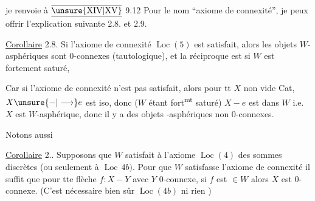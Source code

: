 
je renvoie à $\overline{\underline{\unsure{\mathrm{XIV}|\mathrm{XV}}}}$ 9.12  Pour le nom ``axiome de connexité'', je peux offrir l'explication suivante 2.8. et 2.9.

\uline{Corollaire} 2.8. Si  l'axiome de connexité $\operatorname{Loc}(5)$ est satisfait, alors les objets $W$-asphériques sont $0$-connexes (tautologique), et la réciproque est  si $W$ est fortement saturé, 


Car si l'axiome de connexité n'est pas satisfait, alors pour tt $X$ non vide  Cat, $X\unsure{{-}|\longrightarrow}e$ est iso, donc ($W$ étant fort\textsuperscript{mt} saturé) $X{-}e$ est dans $W$ i.e. $X$ est  $W$-asphérique, donc il y a des objets -asphériques non $0$-connexes.


Notons aussi

\uline{Corollaire} 2.. Supposons que $W$ satisfait à l'axiome $\operatorname{Loc}(4)$ des sommes discrètes (ou seulement à $\operatorname{Loc}\,4b)$. Pour que $W$ satisfasse l'axiome de connexité il suffit que pour tte flèche $f:X{-}Y$ avec $Y$ $0$-connexe, si $f$ est  $\in W$ alors $X$ est $0$-connexe. (C'est nécessaire bien sûr   $\operatorname{Loc}(4b)$ ni rien  )

